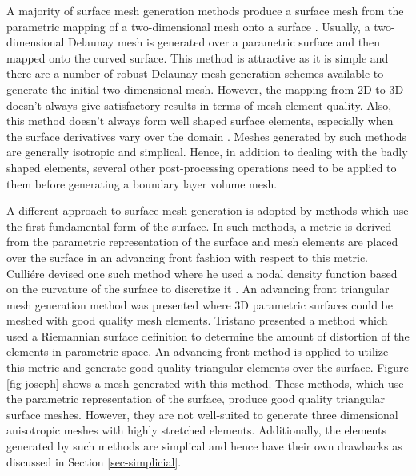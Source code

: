 
A majority of surface mesh generation methods produce a surface mesh from the parametric mapping of a two-dimensional mesh onto a surface \cite{george1998delaunay, chen1997delaunay}. Usually, a two-dimensional Delaunay mesh is generated over a parametric surface and then mapped onto the curved surface. This method is attractive as it is simple and there are a number of robust Delaunay mesh generation schemes available to generate the initial two-dimensional mesh. However, the mapping from 2D to 3D doesn't always give satisfactory results in terms of mesh element quality. Also, this method doesn't always form well shaped surface elements, especially when the surface derivatives vary over the domain \cite{owen1998survey}. Meshes generated by such methods are generally isotropic and simplical. Hence, in addition to dealing with the badly shaped elements, several other post-processing operations need to be applied to them before generating a boundary layer volume mesh.


A different approach to surface mesh generation is adopted by methods which use the first fundamental form of the surface. In such methods, a metric is derived from the parametric representation of the surface and mesh elements are placed over the surface in an advancing front fashion with respect to this metric. Culli\'ere devised one such method where he used a nodal density function based on the curvature of the surface to discretize it \cite{cuilliere1998adaptive}. An advancing front triangular mesh generation method was presented where 3D parametric surfaces could be meshed with good quality mesh elements. Tristano \etal \cite{tristano1998advancing} presented a method which used a Riemannian surface definition to determine the amount of distortion of the elements in parametric space. An advancing front method is applied to utilize this metric and generate good quality triangular elements over the surface. Figure \ref{fig-joseph} shows a mesh generated with this method. These methods, which use the parametric representation of the surface, produce good quality triangular surface meshes. However, they are not well-suited to generate three dimensional anisotropic meshes with highly stretched elements. Additionally, the elements generated by such methods are simplical and hence have their own drawbacks as discussed in Section \ref{sec-simplicial}.

